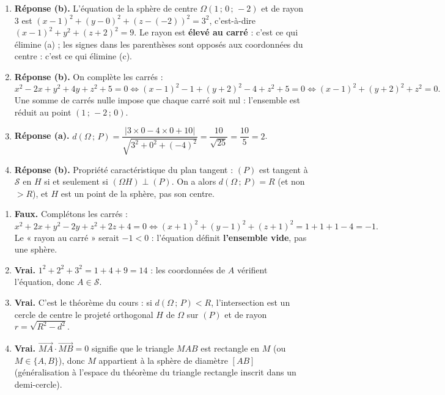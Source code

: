 \documentclass[11pt]{article}
\begin{document}
\begin{corrige}
\begin{enumerate}
\item \textbf{Réponse (b).} L'équation de la sphère de centre $\Omega(1\,;\,0\,;\,-2)$ et de rayon $3$ est $(x-1)^2+(y-0)^2+(z-(-2))^2=3^2$, c'est-à-dire $(x-1)^2+y^2+(z+2)^2=9$. Le rayon est \textbf{élevé au carré} : c'est ce qui élimine (a) ; les signes dans les parenthèses sont opposés aux coordonnées du centre : c'est ce qui élimine (c).
\item \textbf{Réponse (b).} On complète les carrés :
\[x^2-2x+y^2+4y+z^2+5=0 \iff (x-1)^2-1+(y+2)^2-4+z^2+5=0 \iff (x-1)^2+(y+2)^2+z^2=0.\]
Une somme de carrés nulle impose que chaque carré soit nul : l'ensemble est réduit au point $(1\,;\,-2\,;\,0)$.
\item \textbf{Réponse (a).} $d(\Omega\,;\,P)=\dfrac{|3\times 0-4\times 0+10|}{\sqrt{3^2+0^2+(-4)^2}}=\dfrac{10}{\sqrt{25}}=\dfrac{10}{5}=2$.
\item \textbf{Réponse (b).} Propriété caractéristique du plan tangent : $(P)$ est tangent à $\mathcal{S}$ en $H$ si et seulement si $(\Omega H)\perp(P)$. On a alors $d(\Omega\,;\,P)=R$ (et non $>R$), et $H$ est un point de la sphère, pas son centre.
\end{enumerate}
\end{corrige}

\begin{corrige}
\begin{enumerate}
\item \textbf{Faux.} Complétons les carrés :
\[x^2+2x+y^2-2y+z^2+2z+4=0 \iff (x+1)^2+(y-1)^2+(z+1)^2=1+1+1-4=-1.\]
Le « rayon au carré » serait $-1<0$ : l'équation définit \textbf{l'ensemble vide}, pas une sphère.
\item \textbf{Vrai.} $1^2+2^2+3^2=1+4+9=14$ : les coordonnées de $A$ vérifient l'équation, donc $A\in\mathcal{S}$.
\item \textbf{Vrai.} C'est le théorème du cours : si $d(\Omega\,;\,P)<R$, l'intersection est un cercle de centre le projeté orthogonal $H$ de $\Omega$ sur $(P)$ et de rayon $r=\sqrt{R^2-d^2}$.
\item \textbf{Vrai.} $\overrightarrow{MA}\cdot\overrightarrow{MB}=0$ signifie que le triangle $MAB$ est rectangle en $M$ (ou $M\in\{A,B\}$), donc $M$ appartient à la sphère de diamètre $[AB]$ (généralisation à l'espace du théorème du triangle rectangle inscrit dans un demi-cercle).
\end{enumerate}
\end{corrige}
\end{document}
